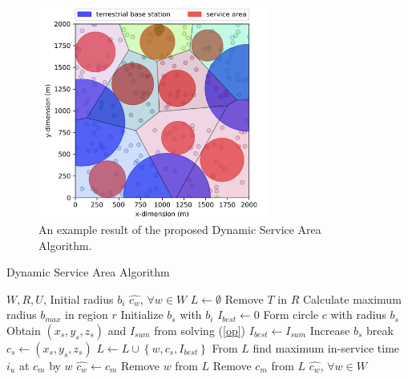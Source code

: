 \documentclass[a4paper,12pt]{report}
\begin{document}
\begin{figure} [h!]
    \centering
    \includegraphics[width=0.68\textwidth]{Figure 4.png}
    \caption{An example result of the proposed Dynamic Service Area Algorithm.}
    \label{fig:DSA example}
\end{figure}
\begin{algorithm}[t!]
    \caption{Dynamic Service Area Algorithm}
    \label{alg:DSA}
    \algrenewcommand{}
    \algrenewcommand{}
    \begin{algorithmic}[1]
    \Require $W, R, U$, Initial radius $b_{i}$
    \Ensure $\hat{c_{w}}$, $\forall w \in W$
    \State $L \gets \emptyset$
    \State Remove $T$ in $R$
            \State Calculate maximum radius $b_{max}$ in region $r$
            \State Initialize $b_s$ with $b_i$
            \State $I_{best} \gets 0 $
                \State Form circle $c$ with radius $b_{s}$
                \State Obtain $(x_s, y_s, z_s)$ and $I_{sum}$ from solving (\ref{op})
                    \State $I_{best} \gets I_{sum}$
                    \State Increase $b_{s}$
                    \State break
                \EndIf
            \EndWhile
            \State $c_s \gets (x_s, y_s, z_s)$
            \State $L \gets L \cup \left \{ w, c_s, I_{best} \right \} $
        \EndFor
    \EndFor
        \State From $L$ find maximum in-service time $i_u$ at $c_m$ by $w$
        \State $\hat{c_{w}} \gets c_m$
        \State Remove $w$ from $L$
        \State Remove $c_m$ from $L$
    \EndWhile
    \State \Return $\hat{c_{w}}$, $\forall w \in W$
    \end{algorithmic}
\end{algorithm}
\end{document}
